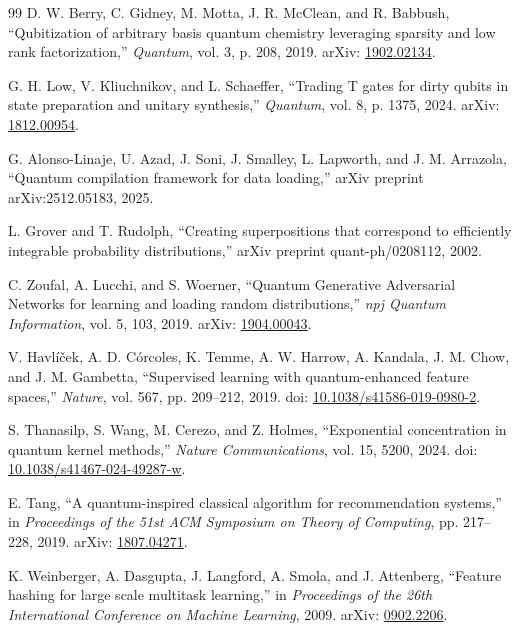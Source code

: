 \documentclass[10pt]{article}
\begin{document}
\begin{thebibliography}{99}
D. W. Berry, C. Gidney, M. Motta, J. R. McClean, and R. Babbush,
``Qubitization of arbitrary basis quantum chemistry leveraging sparsity and low rank factorization,''
\textit{Quantum}, vol. 3, p. 208, 2019.
arXiv: \href{https://arxiv.org/abs/1902.02134}{1902.02134}.

G. H. Low, V. Kliuchnikov, and L. Schaeffer,
``Trading T gates for dirty qubits in state preparation and unitary synthesis,''
\textit{Quantum}, vol. 8, p. 1375, 2024.
arXiv: \href{https://arxiv.org/abs/1812.00954}{1812.00954}.

G. Alonso-Linaje, U. Azad, J. Soni, J. Smalley, L. Lapworth, and J. M. Arrazola,
``Quantum compilation framework for data loading,''
arXiv preprint arXiv:2512.05183, 2025.

L. Grover and T. Rudolph,
``Creating superpositions that correspond to efficiently integrable probability distributions,''
arXiv preprint quant-ph/0208112, 2002.

C. Zoufal, A. Lucchi, and S. Woerner,
``Quantum Generative Adversarial Networks for learning and loading random distributions,''
\textit{npj Quantum Information}, vol. 5, 103, 2019.
arXiv: \href{https://arxiv.org/abs/1904.00043}{1904.00043}.

V. Havl\'i\v{c}ek, A. D. C\'orcoles, K. Temme, A. W. Harrow,
A. Kandala, J. M. Chow, and J. M. Gambetta,
``Supervised learning with quantum-enhanced feature spaces,''
\textit{Nature}, vol. 567, pp. 209--212, 2019.
doi: \href{https://doi.org/10.1038/s41586-019-0980-2}{10.1038/s41586-019-0980-2}.

S. Thanasilp, S. Wang, M. Cerezo, and Z. Holmes,
``Exponential concentration in quantum kernel methods,''
\textit{Nature Communications}, vol. 15, 5200, 2024.
doi: \href{https://doi.org/10.1038/s41467-024-49287-w}{10.1038/s41467-024-49287-w}.

E. Tang,
``A quantum-inspired classical algorithm for recommendation systems,''
in \textit{Proceedings of the 51st ACM Symposium on Theory of Computing}, pp. 217--228, 2019.
arXiv: \href{https://arxiv.org/abs/1807.04271}{1807.04271}.

K. Weinberger, A. Dasgupta, J. Langford, A. Smola, and J. Attenberg,
``Feature hashing for large scale multitask learning,''
in \textit{Proceedings of the 26th International Conference on Machine Learning}, 2009.
arXiv: \href{https://arxiv.org/abs/0902.2206}{0902.2206}.


\end{thebibliography}
\end{document}
